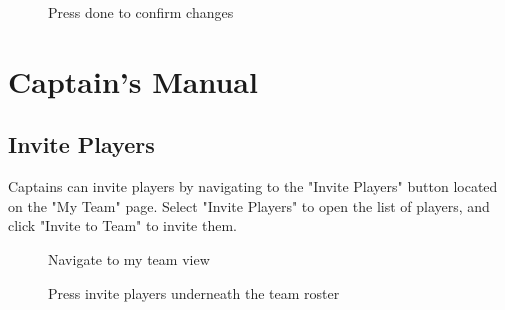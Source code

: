 \documentclass{article}
\begin{document}
\begin{figure}[H]
    \centering
    \caption{Press done to confirm changes}
\end{figure}

\section{Captain's Manual}
\subsection{Invite Players}
Captains can invite players by navigating to the "Invite Players" button located on the "My Team" page. Select "Invite Players" to open the list of players, and click "Invite to Team" to invite them.

\begin{figure}[H]
    \centering
    \caption{Navigate to my team view}
\end{figure}

\begin{figure}[H]
    \centering
    \caption{Press invite players underneath the team roster}
\end{figure}
\end{document}

